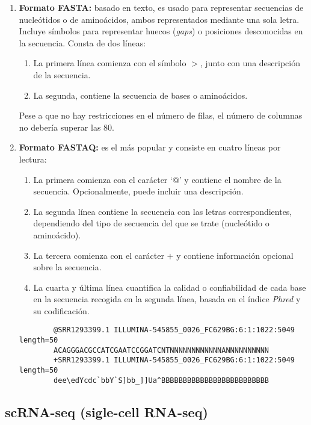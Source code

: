 \begin{enumerate}

    \item \textbf{Formato FASTA:} basado en texto, es usado para representar secuencias de nucleótidos o de aminoácidos, ambos representados mediante una sola letra.
    Incluye símbolos para representar huecos (\textit{gaps}) o posiciones desconocidas en la secuencia. Consta de dos líneas:
    \begin{enumerate}
        \item La primera línea comienza con el símbolo $>$, junto con una descripción de la secuencia.
        \item La segunda, contiene la secuencia de bases o aminoácidos. 
    \end{enumerate}

    Pese a que no hay restricciones en el número de filas, el número de columnas no debería superar las 80.
    
    \item \textbf{Formato FASTAQ:} es el más popular y consiste en cuatro líneas por lectura:
    \begin{enumerate}
        \item La primera comienza con el carácter `@' y contiene el nombre de la secuencia. Opcionalmente, puede incluir una descripción.
        \item La segunda línea contiene la secuencia con las letras correspondientes, dependiendo del tipo de secuencia del que se trate (nucleótido o aminoácido).
        \item La tercera comienza con el carácter $+$ y contiene información opcional sobre la secuencia.
        \item La cuarta y última línea cuantifica la calidad o confiabilidad de cada base en la secuencia recogida en la segunda línea, basada en el índice \textit{Phred} y su codificación. 
    \end{enumerate}

    \begin{lstlisting}
        @SRR1293399.1 ILLUMINA-545855_0026_FC629BG:6:1:1022:5049 length=50
        ACAGGGACGCCATCGAATCCGGATCNTNNNNNNNNNNNNANNNNNNNNNN
        +SRR1293399.1 ILLUMINA-545855_0026_FC629BG:6:1:1022:5049 length=50
        dee\edYcdc`bbY`S]bb_]]Ua^BBBBBBBBBBBBBBBBBBBBBBBBB
    \end{lstlisting}

\end{enumerate}

\subsection{scRNA-seq (sigle-cell RNA-seq)}

